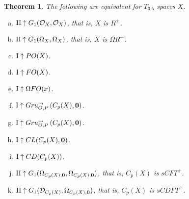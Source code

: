 \documentclass{amsart}
\theoremstyle{plain}
\newtheorem{theorem}{Theorem}
\theoremstyle{definition}
\theoremstyle{remark}
\theoremstyle{plain}
\theoremstyle{definition}
\theoremstyle{remark}
\begin{document}
\begin{theorem}
 The following are equivalent for \(T_{3.5}\) spaces \(X\).
 \begin{enumerate}[a)]
  \item \(\mathrm{II}\uparrow G_{1}(\mathcal{O}_X,\mathcal{O}_X)\), that is, \(X\) is \(R^+\).
  \item \(\mathrm{II}\uparrow G_{1}(\Omega_X,\Omega_X)\), that is, \(X\) is \(\Omega R^+\).
  \item \(\mathrm{I}\uparrow PO(X)\). 
  \item \(\mathrm{I}\uparrow FO(X)\).
  \item \(\mathrm{I}\uparrow\Omega FO(x)\).
  \item \(\mathrm{I}\uparrow Gru_{O,P}^{\to}\left({C_p(X)},{\mathbf 0}\right)\).
  \item \(\mathrm{I}\uparrow Gru_{O,P}^{\leadsto}\left({C_p(X)},{\mathbf 0}\right)\).
  \item \(\mathrm{I}\uparrow CL(C_p(X),\mathbf 0)\).
  \item \(\mathrm{I}\uparrow CD(C_p(X))\).
  \item \(\mathrm{II}\uparrow G_{1}(\Omega_{C_p(X),\mathbf 0},\Omega_{C_p(X),\mathbf 0})\),
        that is, \(C_p(X)\) is \(sCFT^+\).
  \item \(\mathrm{II}\uparrow G_{1}(\mathcal{D}_{C_p(X)},\Omega_{C_p(X),\mathbf 0})\),
        that is, \(C_p(X)\) is \(sCDFT^+\).
 \end{enumerate}
\end{theorem}
\end{document}
